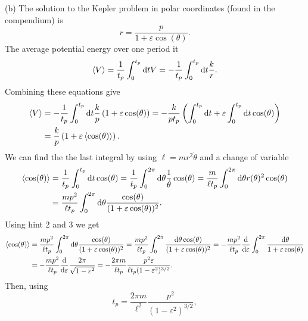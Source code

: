 \documentclass{article}
\begin{document}
        (b) The solution to the Kepler problem in polar coordinates (found in the compendium) is 
        \begin{equation*}
            r = \frac{p}{1 + \varepsilon \cos(\theta)}.
        \end{equation*}
        The average potential energy over one period it
        \begin{equation*}
            \expval{V} = \frac{1}{t_p} \int_0^{t_p} \dd t V = -\frac{1}{t_p} \int_0^{t_p} \dd t \frac{k}{r}.
        \end{equation*}
        Combining these equations give
        \begin{align*}
            \expval{V} &= - \frac{1}{t_p}  \int_0^{t_p} \dd t \frac{k}{p} \left(1 + \varepsilon \cos(\theta)\right) = - \frac{k}{p t_p} \left(\int_0^{t_p} \dd t + \varepsilon \int_0^{t_p} \dd t\cos(\theta)\right) \\
            & = \frac{k}{p} \left(1 + \varepsilon\expval{\cos(\theta)}\right).
        \end{align*}
        We can find the the last integral by using $\ell = m r^2 \dot \theta$ and a change of variable
        \begin{align*}
            \expval{\cos(\theta)} & = \frac{1}{t_p}  \int_0^{t_p} \dd t \cos(\theta) 
            = \frac{1}{t_p}  \int_0^{2 \pi} \dd \theta \frac{1}{\dot \theta} \cos(\theta) = \frac{m }{\ell t_p} \int_0^{2 \pi} \dd \theta r(\theta)^2 \cos(\theta) \\
            &= \frac{m p^2}{\ell t_p} \int_0^{2 \pi} \dd \theta \frac{\cos(\theta) }{(1 + \varepsilon \cos(\theta))^2}.
        \end{align*}
        Using hint 2 and 3 we get
        \begin{align*}
            \expval{\cos(\theta)} & = \frac{m p^2}{\ell t_p} \int_0^{2 \pi} \dd \theta \frac{\cos(\theta) }{(1 + \varepsilon \cos(\theta))^2} =    
            \frac{m p^2}{\ell t_p} \int_0^{2\pi} \frac{\dd \theta \cos(\theta)}{(1 + \varepsilon \cos(\theta))^2} = 
            - \frac{m p^2}{\ell t_p} \dv{\varepsilon} \int_0^{2\pi} \frac{\dd \theta}{1 + \varepsilon \cos(\theta)} \\
                & = - \frac{m p^2}{\ell t_p}\dv{\varepsilon} \frac{2 \pi}{\sqrt{1 - \varepsilon^2}} = - \frac{2 \pi m}{\ell t_p}  \frac{ p^2 \varepsilon}{\ell t_p(1 - \varepsilon^2)^{3/2}}.
        \end{align*}
        Then, using 
        \begin{equation*}
            t_p =  \frac{2 \pi m}{\ell^2} \frac{p^2}{(1 - \varepsilon^2)^{3/2}},
        \end{equation*}
\end{document}
